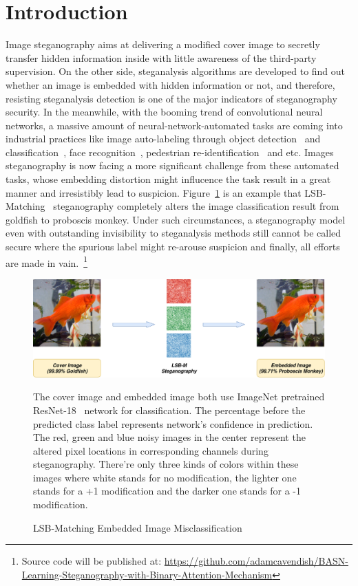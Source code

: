 \section{Introduction}

Image steganography aims at delivering a modified cover image to secretly transfer hidden information inside with little awareness of the third-party supervision. On the other side, steganalysis algorithms are developed to find out whether an image is embedded with hidden information or not, and therefore, resisting steganalysis detection is one of the major indicators of steganography security. In the meanwhile, with the booming trend of convolutional neural networks, a massive amount of neural-network-automated tasks are coming into industrial practices like image auto-labeling through object detection~\cite{Fast_R_CNN,YOLO} and classification~\cite{ResNet,InceptionV4}, face recognition~\cite{FaceNet}, pedestrian re-identification~\cite{CamStylePedestrian} and etc. Images steganography is now facing a more significant challenge from these automated tasks, whose embedding distortion might influcence the task result in a great manner and irresistibly lead to suspicion. Figure~\ref{fig:steganography_distortion} is an example that LSB-Matching~\cite{LSBRevisited} steganography completely alters the image classification result from goldfish to proboscis monkey. Under such circumstances, a steganography model even with outstanding invisibility to steganalysis methods still cannot be called secure where the spurious label might re-arouse suspicion and finally, all efforts are made in vain.~\footnote{Source code will be published at: \url{https://github.com/adamcavendish/BASN-Learning-Steganography-with-Binary-Attention-Mechanism}}%

\begin{figure}
  \centering
  \includegraphics[width=0.9\columnwidth]{images/Steganography-Distortion/Steganography-Distortion.png}%
  \caption{LSB-Matching Embedded Image Misclassification}%
  \label{fig:steganography_distortion}
  \vspace{\baselineskip}
  The cover image and embedded image both use ImageNet pretrained ResNet-18~\cite{ResNet} network for classification. The percentage before the predicted class label represents network's confidence in prediction. The red, green and blue noisy images in the center represent the altered pixel locations in corresponding channels during steganography. There're only three kinds of colors within these images where white stands for no modification, the lighter one stands for a +1 modification and the darker one stands for a -1 modification.
\end{figure}

